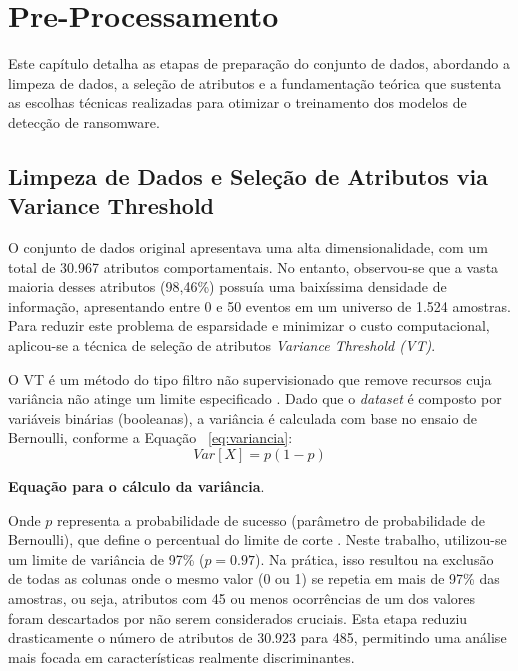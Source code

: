 
\section{Pre-Processamento} \label{sec:preproc}

Este capítulo detalha as etapas de preparação do conjunto de dados, abordando a limpeza de dados, a seleção de atributos e a fundamentação teórica que sustenta as escolhas técnicas realizadas para otimizar o treinamento dos modelos de detecção de ransomware.

\subsection{Limpeza de Dados e Seleção de Atributos via Variance Threshold} \label{subsec:limpezadados}

O conjunto de dados original apresentava uma alta dimensionalidade, com um total de 30.967 atributos comportamentais. No entanto, observou-se que a vasta maioria desses atributos (98,46\%) possuía uma baixíssima densidade de informação, apresentando entre 0 e 50 eventos em um universo de 1.524 amostras. Para reduzir este problema de esparsidade e minimizar o custo computacional, aplicou-se a técnica de seleção de atributos \textit{Variance Threshold (VT)}.

O VT é um método do tipo filtro não supervisionado que remove recursos cuja variância não atinge um limite especificado \cite{kuhn2013applied}. Dado que o \textit{dataset} é composto por variáveis binárias (booleanas), a variância é calculada com base no ensaio de Bernoulli, conforme a Equação ~\ref{eq:variancia}:
\begin{equation} \label{eq:variancia} 
	Var[X] = p(1 - p) 
\end{equation}
\begin{center}
	\textbf{Equação para o cálculo da variância}.
\end{center}

Onde $p$ representa a probabilidade de sucesso (parâmetro de probabilidade de Bernoulli), que define o percentual do limite de corte \cite{scikit-learn}. Neste trabalho, utilizou-se um limite de variância de 97\% ($p = 0.97$). Na prática, isso resultou na exclusão de todas as colunas onde o mesmo valor (0 ou 1) se repetia em mais de 97\% das amostras, ou seja, atributos com 45 ou menos ocorrências de um dos valores foram descartados por não serem considerados cruciais. Esta etapa reduziu drasticamente o número de atributos de 30.923 para 485, permitindo uma análise mais focada em características realmente discriminantes.

